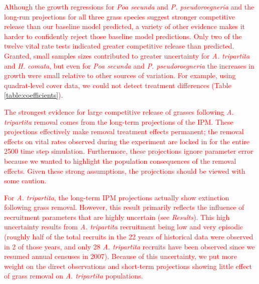 \documentclass[11pt]{article}
\newcommand{\new}{\textcolor{red}}
\begin{document}
\begin{doublespacing}
\new{Although the growth regressions for \textit{Poa secunda} and \textit{P. pseudoroegneria} and the long-run projections for all three grass species suggest stronger competitive release than our baseline model predicted, a variety of other evidence makes it harder to confidently reject those baseline model predictions. Only two of the twelve vital rate tests indicated greater competitive release than predicted. Granted, small samples sizes contributed to greater uncertainty for \textit{A. tripartita} and \textit{H. comata}, but even for \textit{Poa secunda} and \textit{P. pseudoroegneria} the increases in growth were small relative to other sources of variation. For example, using quadrat-level cover data, we could not detect treatment differences (Table \ref{table:coefficients}).  }

\new{The strongest evidence for large competitive release of grasses following \textit{A. tripartita} removal comes from the long-term projections of the IPM. These projections effectively make removal treatment effects permanent; the removal effects on vital rates observed during the experiment are locked in for the entire 2500 time step simulation. Furthermore, these projections ignore parameter error because we wanted to highlight the population consequences of the removal effects. Given these strong assumptions, the projections should be viewed with some caution.  }

\new{For \textit{A. tripartita}, the long-term IPM projections actually show extinction following grass removal.
However, this result primarily reflects the influence of recruitment parameters that are highly uncertain (see \emph{Results}). This high uncertainty results from \textit{A. tripartita} recruitment being low and very episodic (roughly half of the total recruits in the 22 years of historical data were observed in 2 of those years, and only 28 \textit{A. tripartita} recruits have been observed since we resumed annual censuses in 2007). Because of this uncertainty, we put more weight on the direct observations and short-term projections showing little effect of grass removal on \textit{A. tripartita} populations.}


\end{doublespacing}
\end{document}
